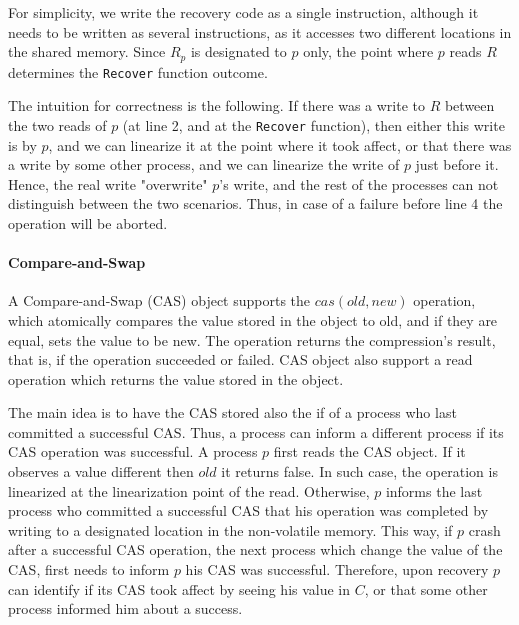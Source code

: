 For simplicity, we write the recovery code as a single instruction, although it needs to be written as several instructions, as it accesses two different locations in the shared memory. Since $R_p$ is designated to $p$ only, the point where $p$ reads $R$ determines the \texttt{Recover} function outcome.

The intuition for correctness is the following. If there was a write to $R$ between the two reads of $p$ (at line 2, and at the \texttt{Recover} function), then either this write is by $p$, and we can linearize it at the point where it took affect, or that there was a write by some other process, and we can linearize the write of $p$ just before it. Hence, the real write "overwrite" $p$'s write, and the rest of the processes can not distinguish between the two scenarios. Thus, in case of a failure before line 4 the operation will be aborted.


\paragraph*{Compare-and-Swap}

A Compare-and-Swap (CAS) object supports the $cas(old,new)$ operation, which atomically compares the value stored in the object to old, and if they are equal, sets the value to be new. The operation returns the compression's result, that is, if the operation succeeded or failed. CAS object also support a read operation which returns the value stored in the object.

The main idea is to have the CAS stored also the if of a process who last committed a successful CAS. Thus, a process can inform a different process if its CAS operation was successful.
A process $p$ first reads the CAS object. If it observes a value different then $old$ it returns false. In such case, the operation is linearized at the linearization point of the read. Otherwise, $p$ informs the last process who committed a successful CAS that his operation was completed by writing to a designated location in the non-volatile memory. This way, if $p$ crash after a successful CAS operation, the next process which change the value of the CAS, first needs to inform $p$ his CAS was successful. Therefore, upon recovery $p$ can identify if its CAS took affect by seeing his value in $C$, or that some other process informed him about a success.


